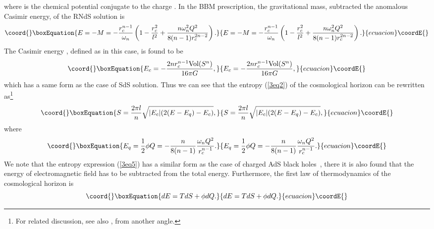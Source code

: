\documentclass[a4paper,12pt]{article}
\begin{document}
where \myHighlight{$\phi$}\coordHE{} is the chemical potential conjugate to the charge \coordHE{}. In the BBM prescription,
the gravitational mass, subtracted the anomalous Casimir energy, of the RNdS solution is
\begin{equation}\coord{}\boxEquation{
\label{3eq3}
E=-M =-\frac{r_c^{n-1}}{\omega_n} \left (1 -\frac{r_c^2}{l^2} +
    \frac{n\omega_n^2 Q^2}{8(n-1)r_c^{2n-2}}\right).  
}{
E=-M =-\frac{r_c^{n-1}}{\omega_n} \left (1 -\frac{r_c^2}{l^2} +
    \frac{n\omega_n^2 Q^2}{8(n-1)r_c^{2n-2}}\right).  
}{ecuacion}\coordE{}\end{equation}
The Casimir energy \coordHE{}, defined as \coordHE{} in this case, is
found to be
\begin{equation}\coord{}\boxEquation{
\label{3eq4}
E_c=-\frac{2nr_c^{n-1}\mbox{Vol}(S^n)}{16\pi G},
}{
E_c=-\frac{2nr_c^{n-1}\mbox{Vol}(S^n)}{16\pi G},
}{ecuacion}\coordE{}\end{equation}
which has a same form as the case of SdS solution. Thus we can see that the entropy (\ref{3eq2})
of the cosmological horizon can be rewritten as\footnote{For related discussion, see 
also \cite{Med}, from another angle.}
\begin{equation}\coord{}\boxEquation{
\label{3eq5}
S=\frac{2\pi l}{n}\sqrt{|E_c|(2(E-E_q)-E_c)},
}{
S=\frac{2\pi l}{n}\sqrt{|E_c|(2(E-E_q)-E_c)},
}{ecuacion}\coordE{}\end{equation}
where
\begin{equation}\coord{}\boxEquation{
E_q = \frac{1}{2}\phi Q =-\frac{n}{8(n-1)}\frac{\omega_n Q^2}{r_c^{n-1}}. 
}{
E_q = \frac{1}{2}\phi Q =-\frac{n}{8(n-1)}\frac{\omega_n Q^2}{r_c^{n-1}}. 
}{ecuacion}\coordE{}\end{equation} 
We note that  the entropy expression (\ref{3eq5}) has a similar form as the case of
charged AdS black holes~\cite{Cai2}, there it is also found that the energy of electromagnetic
field has to be subtracted from the total energy. Furthermore, the first law of thermodynamics
of the cosmological horizon is
\begin{equation}\coord{}\boxEquation{
\label{3eq7}
dE =TdS +\phi dQ.
}{
dE =TdS +\phi dQ.
}{ecuacion}\coordE{}\end{equation}
\end{document}
